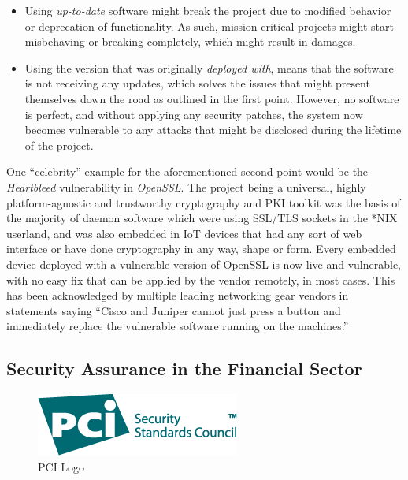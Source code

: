 \documentclass[a4paper,12pt]{article}
\begin{document}
	\begin{itemize}
		\item Using \textit{up-to-date} software might break the project due to modified behavior or deprecation of functionality. As such, mission critical projects might start misbehaving or breaking completely, which might result in damages.
		\item Using the version that was originally \textit{deployed with}, means that the software is not receiving any updates, which solves the issues that might present themselves down the road as outlined in the first point. However, no software is perfect, and without applying any security patches, the system now becomes vulnerable to any attacks that might be disclosed during the lifetime of the project.
	\end{itemize}
	
	One ``celebrity'' example for the aforementioned second point would be the \textit{Heartbleed} vulnerability in \textit{OpenSSL}. The project being a universal, highly platform-agnostic and trustworthy cryptography and PKI toolkit was the basis of the majority of daemon software which were using SSL/TLS sockets in the *NIX userland, and was also embedded in IoT devices that had any sort of web interface or have done cryptography in any way, shape or form. Every embedded device deployed with a vulnerable version of OpenSSL is now live and vulnerable, with no easy fix that can be applied by the vendor remotely, in most cases. This has been acknowledged by multiple leading networking gear vendors in statements saying ``Cisco and Juniper cannot just press a button and immediately replace the vulnerable software running on the machines.''\cite{jpaglier14}
	
\subsection{Security Assurance in the Financial Sector} \label{secassfinsec}
 

	\begin{figure}
		\vspace{-10pt}
		\centering
		\includegraphics[scale=0.5]{pci.png}
		\caption{PCI Logo}
	\end{figure}
\end{document}
